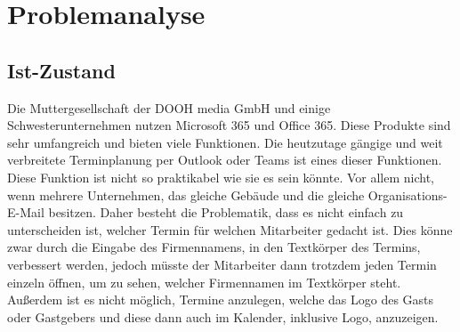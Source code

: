


\section{Problemanalyse}\label{sec:problemanalyse}
\subsection{Ist-Zustand}\label{subsec:ist-zustand}
Die Muttergesellschaft der DOOH media GmbH und einige Schwesterunternehmen nutzen Microsoft 365 und Office 365.
Diese Produkte sind sehr umfangreich und bieten viele Funktionen.
Die heutzutage gängige und weit verbreitete Terminplanung per Outlook oder Teams ist eines dieser Funktionen.
Diese Funktion ist nicht so praktikabel wie sie es sein könnte.
Vor allem nicht, wenn mehrere Unternehmen, das gleiche Gebäude und die gleiche Organisations-E-Mail besitzen.
Daher besteht die Problematik, dass es nicht einfach zu unterscheiden ist, welcher Termin für welchen Mitarbeiter gedacht ist.
Dies könne zwar durch die Eingabe des Firmennamens, in den Textkörper des Termins, verbessert werden, jedoch müsste der Mitarbeiter dann trotzdem jeden Termin einzeln öffnen, um zu sehen, welcher Firmennamen im Textkörper steht.
\newline
Außerdem ist es nicht möglich, Termine anzulegen, welche das Logo des Gasts oder Gastgebers und diese dann auch im Kalender, inklusive Logo, anzuzeigen.
